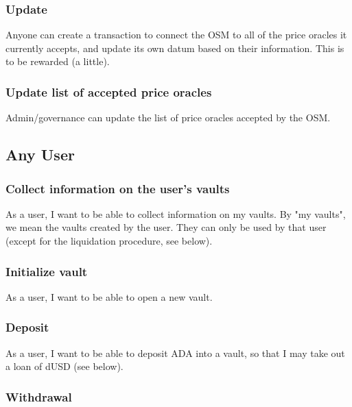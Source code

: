 \documentclass{article} %
\begin{document}

\subsubsection{Update}

Anyone can create a transaction to connect the OSM to all of the price oracles
it currently accepts, and update its own datum based on their information.
This is to be rewarded (a little).

\subsubsection{Update list of accepted price oracles}

Admin/governance can update the list of price oracles accepted by the OSM.


\subsection{Any User}

\subsubsection{Collect information on the user's vaults}

As a user, I want to be able to collect information on my vaults. By "my
vaults", we mean the vaults created by the user. They can only be used by that
user (except for the liquidation procedure, see below).

\subsubsection{Initialize vault}

As a user, I want to be able to open a new vault.

\subsubsection{Deposit}

As a user, I want to be able to deposit ADA into a vault, so that I may take out
a loan of dUSD (see below).

\subsubsection{Withdrawal}
\end{document}
